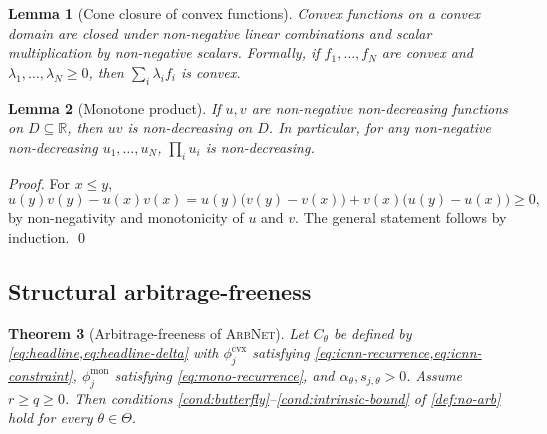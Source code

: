 \documentclass[largeformat]{interact}
\theoremstyle{plain}
\newtheorem{theorem}{Theorem}[section]
\newtheorem{lemma}[theorem]{Lemma}
\theoremstyle{definition}
\newcommand{\R}{\mathbb{R}}
\newcommand{\arbnet}{\textsc{ArbNet}}
\begin{document}
\begin{lemma}[Cone closure of convex functions]
\label{lem:cone-closure}
Convex functions on a convex domain are closed under non-negative linear combinations and scalar multiplication by non-negative scalars. Formally, if $f_1, \dots, f_N$ are convex and $\lambda_1, \dots, \lambda_N \geq 0$, then $\sum_i \lambda_i f_i$ is convex.
\end{lemma}

\begin{lemma}[Monotone product]
\label{lem:mono-product}
If $u, v$ are non-negative non-decreasing functions on $D \subseteq \R$, then $uv$ is non-decreasing on $D$. In particular, for any non-negative non-decreasing $u_1, \dots, u_N$, $\prod_i u_i$ is non-decreasing.
\end{lemma}
\begin{proof}
For $x \leq y$,
\[
u(y)v(y) - u(x)v(x) = u(y)\bigl(v(y) - v(x)\bigr) + v(x)\bigl(u(y) - u(x)\bigr) \geq 0,
\]
by non-negativity and monotonicity of $u$ and $v$. The general statement follows by induction.
\qed
\end{proof}

\subsection{Structural arbitrage-freeness}
\label{sec:no-arb-theorem-formal}

\begin{theorem}[Arbitrage-freeness of \arbnet{}]
\label{thm:arbitrage-free}
Let $C_\theta$ be defined by \cref{eq:headline,eq:headline-delta} with $\phi^{\mathrm{cvx}}_j$ satisfying \cref{eq:icnn-recurrence,eq:icnn-constraint}, $\phi^{\mathrm{mon}}_j$ satisfying \cref{eq:mono-recurrence}, and $\alpha_\theta, s_{j,\theta} > 0$. Assume $r \geq q \geq 0$. Then conditions \ref{cond:butterfly}--\ref{cond:intrinsic-bound} of \cref{def:no-arb} hold for every $\theta \in \Theta$.
\end{theorem}
\end{document}
